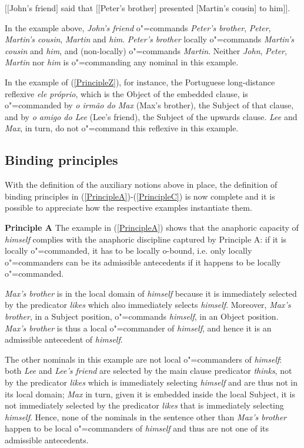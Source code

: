 \documentclass[output=paper
,modfonts
,nonflat]{langsci/langscibook}
\begin{document}
\begin{exe}
\ex $[[$John's friend$]$ said that $[[$Peter's brother$]$ presented [Martin's cousin] to him$]]$.
\end{exe}

In the example above, {\em John's friend} o"=commands {\em Peter's brother}, {\em Peter}, 
{\em Martin's cousin}, {\em Martin} and {\em him}. 
{\em Peter's brother} locally o"=commands {\em Martin's cousin} and {\em him},
and (non-locally) o"=commands {\em Martin}. Neither {\em John}, {\em Peter}, {\em Martin} nor {\em him} is o"=commanding
any nominal in this example.

In the example of (\ref{PrincipleZ}), for instance, the Portuguese long-distance reflexive {\em ele pr\'{o}prio},
which is the Object of the embedded clause, is o"=commanded by {\em o irm\~{a}o do Max} (Max's brother),
the Subject of that clause, and by {\em o amigo do Lee} (Lee's friend), the Subject of the upwards clause.
{\em Lee} and {\em Max}, in  turn, do not o"=command this reflexive in this example.


\subsection{Binding principles}\label{principles}

With the definition of the auxiliary notions above in place, the definition 
of binding principles in (\ref{PrincipleA})-(\ref{PrincipleC}) is now complete and it is possible
to appreciate how the respective examples instantiate them.

{\bf Principle A} The example in (\ref{PrincipleA}) shows that the anaphoric capacity of {\em himself} complies with 
the anaphoric discipline captured by Principle A: if it is locally o"=commanded, it has to be locally o-bound, 
i.e. only locally o"=commanders can be its admissible antecedents if it happens to be locally o"=commanded.

{\em Max's brother} is in the local domain
of {\em himself} because it is immediately selected by the predicator {\em likes} which also
immediately selects {\em himself}. Moreover, {\em Max's brother}, in a Subject position, 
o"=commands {\em himself}, in an Object position. {\em Max's brother}
is thus a local o"=commander of {\em himself}, and hence it is an admissible antecedent
of {\em himself}. 

The other nominals in this example are not local o"=commanders of {\em himself}: both
{\em Lee} and {\em Lee's friend} are selected by the main clause predicator {\em thinks},
not by the predicator {\em likes} which is immediately selecting {\em himself} and are thus not 
in its local domain; {\em Max} in turn, given it is embedded inside the local Subject, it is not immediately selected 
by the predicator {\em likes} that is immediately selecting {\em himself}. Hence, none of
the nominals in the sentence other than {\em Max's brother} happen to be local o"=commanders of {\em himself} 
and thus are not one of its admissible antecedents.
\end{document}
